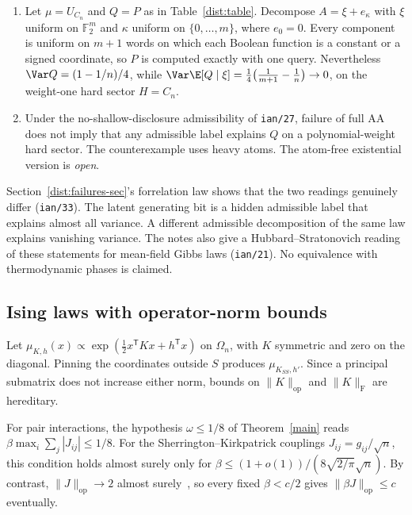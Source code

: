 \begin{proposition}\label{dist:label-only-fails}
\leavevmode
\begin{enumerate}
\item Let \(\mu=U_{C_n}\) and \(Q=P\) as in Table~\ref{dist:table}. Decompose
\(A=\xi+e_\kappa\) with \(\xi\) uniform on \(\mathbb F_2^m\) and \(\kappa\)
uniform on \(\{0,\dots,m\}\), where \(e_0=0\). Every component is uniform on
\(m+1\) words on which each Boolean function is a constant or a signed
coordinate, so \(P\) is computed exactly with one query. Nevertheless
\(\Var Q=(1-1/n)/4\), while
\(\Var\E[Q\mid\xi]=\tfrac14\bigl(\tfrac1{m+1}-\tfrac1n\bigr)\to0\), on the
weight-one hard sector \(H=C_n\).
\item Under the no-shallow-disclosure admissibility of \texttt{ian/27},
failure of full AA does not imply that any admissible label explains \(Q\) on a
polynomial-weight hard sector. The counterexample uses heavy atoms. The
atom-free existential version is \emph{open}.
\end{enumerate}
\end{proposition}
Section~\ref{dist:failures-sec}'s forrelation law shows that the two readings
genuinely differ (\texttt{ian/33}). The latent generating bit is a hidden
admissible label that explains almost all variance. A different admissible
decomposition of the same law explains vanishing variance. The notes also give
a Hubbard--Stratonovich reading of these statements for mean-field Gibbs laws
(\texttt{ian/21}). No equivalence with thermodynamic phases is claimed.

\subsection{Ising laws with operator-norm bounds}\label{dist:spectral}
Let \(\mu_{K,h}(x)\propto\exp(\tfrac12x^{\mathsf T}Kx+h^{\mathsf T}x)\) on
\(\Omega_n\), with \(K\) symmetric and zero on the diagonal. Pinning the
coordinates outside \(S\) produces \(\mu_{K_{SS},h'}\). Since a principal
submatrix does not increase either norm, bounds on \(\|K\|_{\mathrm{op}}\) and
\(\|K\|_{\mathrm F}\) are hereditary.

\begin{proposition}\label{dist:sk-noncoverage}
For pair interactions, the hypothesis \(\omega\le1/8\) of
Theorem~\ref{main} reads \(\beta\max_i\sum_j|J_{ij}|\le1/8\). For the Sherrington--Kirkpatrick couplings
\(J_{ij}=g_{ij}/\sqrt n\), this condition holds almost surely only for
\(\beta\le(1+o(1))/(8\sqrt{2/\pi}\sqrt n)\). By contrast,
\(\|J\|_{\mathrm{op}}\to2\) almost surely~\cite{FK81,BY88}, so every fixed
\(\beta<c/2\) gives \(\|\beta J\|_{\mathrm{op}}\le c\) eventually.
\end{proposition}

